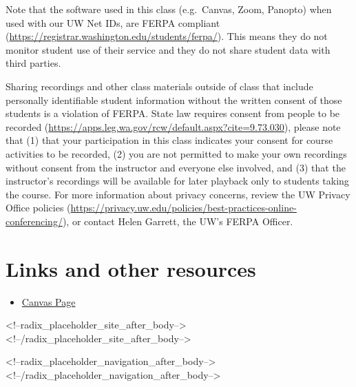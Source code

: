 \documentclass[
]{article}
\providecommand{\tightlist}{%
  \setlength{\itemsep}{0pt}\setlength{\parskip}{0pt}}
\begin{document}
Note that the software used in this class (e.g.~Canvas, Zoom, Panopto)
when used with our UW Net IDs, are FERPA compliant
(\url{https://registrar.washington.edu/students/ferpa/}). This means
they do not monitor student use of their service and they do not share
student data with third parties.

Sharing recordings and other class materials outside of class that
include personally identifiable student information without the written
consent of those students is a violation of FERPA. State law requires
consent from people to be recorded
(\url{https://apps.leg.wa.gov/rcw/default.aspx?cite=9.73.030}), please
note that (1) that your participation in this class indicates your
consent for course activities to be recorded, (2) you are not permitted
to make your own recordings without consent from the instructor and
everyone else involved, and (3) that the instructor's recordings will be
available for later playback only to students taking the course. For
more information about privacy concerns, review the UW Privacy Office
policies
(\url{https://privacy.uw.edu/policies/best-practices-online-conferencing/}),
or contact Helen Garrett, the UW's FERPA Officer.

\hypertarget{links-and-other-resources}{%
\section{Links and other resources}\label{links-and-other-resources}}

\begin{itemize}
\tightlist
\item
  \href{https://canvas.uw.edu/courses/1519560}{Canvas Page}
\end{itemize}

<!--radix_placeholder_site_after_body-->
<!--/radix_placeholder_site_after_body-->

<!--radix_placeholder_navigation_after_body-->
<!--/radix_placeholder_navigation_after_body-->
\end{document}
